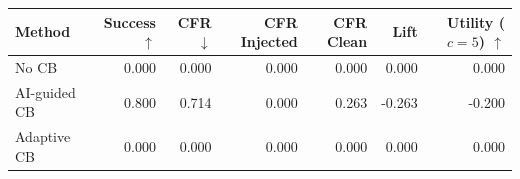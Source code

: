 \begin{tabular}{lrrrrrr}
\toprule
Method & Success $\uparrow$ & CFR $\downarrow$ & CFR Injected & CFR Clean & Lift & Utility ($c=5$) $\uparrow$ \\
\midrule
No CB & 0.000 & 0.000 & 0.000 & 0.000 & 0.000 & 0.000 \\
AI-guided CB & 0.800 & 0.714 & 0.000 & 0.263 & -0.263 & -0.200 \\
Adaptive CB & 0.000 & 0.000 & 0.000 & 0.000 & 0.000 & 0.000 \\
\bottomrule
\end{tabular}
